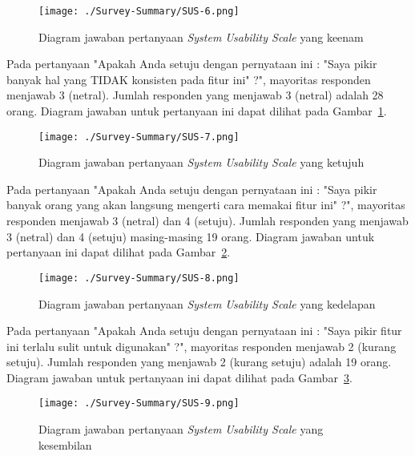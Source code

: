 \begin{figure}[H]
	\centering  
	\texttt{[image: ./Survey-Summary/SUS-6.png]}
	\caption[Diagram jawaban pertanyaan \textit{System Usability Scale} yang keenam]{Diagram jawaban pertanyaan \textit{System Usability Scale} yang keenam} 
	\label{fig:summary-SUS-6} 
\end{figure}

Pada pertanyaan "Apakah Anda setuju dengan pernyataan ini : "Saya pikir banyak hal yang TIDAK konsisten pada fitur ini" ?", mayoritas responden menjawab 3 (netral). Jumlah responden yang menjawab 3 (netral) adalah 28 orang. Diagram jawaban untuk pertanyaan ini dapat dilihat pada Gambar~\ref{fig:summary-SUS-6}.

\begin{figure}[H]
	\centering  
	\texttt{[image: ./Survey-Summary/SUS-7.png]}
	\caption[Diagram jawaban pertanyaan \textit{System Usability Scale} yang ketujuh]{Diagram jawaban pertanyaan \textit{System Usability Scale} yang ketujuh} 
	\label{fig:summary-SUS-7} 
\end{figure}

Pada pertanyaan "Apakah Anda setuju dengan pernyataan ini : "Saya pikir banyak orang yang akan langsung mengerti cara memakai fitur ini" ?", mayoritas responden menjawab 3 (netral) dan 4 (setuju). Jumlah responden yang menjawab 3 (netral) dan 4 (setuju) masing-masing 19 orang. Diagram jawaban untuk pertanyaan ini dapat dilihat pada Gambar~\ref{fig:summary-SUS-7}.

\begin{figure}[H]
	\centering  
	\texttt{[image: ./Survey-Summary/SUS-8.png]}
	\caption[Diagram jawaban pertanyaan \textit{System Usability Scale} yang kedelapan]{Diagram jawaban pertanyaan \textit{System Usability Scale} yang kedelapan}
	\label{fig:summary-SUS-8} 
\end{figure}

Pada pertanyaan "Apakah Anda setuju dengan pernyataan ini : "Saya pikir fitur ini terlalu sulit untuk digunakan" ?", mayoritas responden menjawab 2 (kurang setuju). Jumlah responden yang menjawab 2 (kurang setuju) adalah 19 orang. Diagram jawaban untuk pertanyaan ini dapat dilihat pada Gambar~\ref{fig:summary-SUS-8}.

\begin{figure}[H]
	\centering  
	\texttt{[image: ./Survey-Summary/SUS-9.png]}
	\caption[Diagram jawaban pertanyaan \textit{System Usability Scale} yang kesembilan]{Diagram jawaban pertanyaan \textit{System Usability Scale} yang kesembilan} 
	\label{fig:summary-SUS-9} 
\end{figure}


